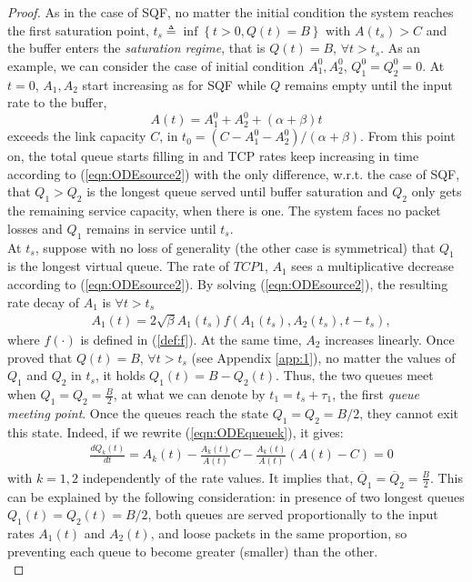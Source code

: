 \documentclass[a4paper,oneside, 11pt]{article}
\begin{document}
\begin{proof}
As in the case of SQF, no matter the initial condition the system reaches the first saturation point,
$ t_s \triangleq  \inf\left \{ t>0, Q(t)=B \right \}$
with $A(t_s)>C$ and the buffer enters the \textit{saturation regime}, that is $Q(t)=B$, $\forall t>t_s$.
As an example, we can consider the case of initial condition $A_1^0,A_2^0$, $Q_1^0=Q_2^0=0$.
At $t=0$, $A_1,A_2$ start increasing as for SQF while $Q$ remains empty
until the input rate to the buffer, $$A(t)=A_1^0+A_2^0+(\alpha+\beta)t$$
exceeds the link capacity $C$, in $t_0=(C-A_1^0-A_2^0)/(\alpha+\beta)$.
From this point on, the total queue starts filling in and TCP rates keep increasing in time according to (\ref{eqn:ODEsource2}) with the only difference, w.r.t. the case of SQF, that
$Q_1>Q_2$ is the longest queue served until buffer saturation and $Q_2$ only gets the remaining service capacity, when there is one.
The system faces no packet losses and $Q_1$ remains in service until  $t_s$.\\
At $t_s$,
suppose with no loss of generality (the other case is symmetrical) that $Q_1$ is the longest virtual queue. The rate of $TCP1$, $A_1$ sees a multiplicative decrease according to (\ref{eqn:ODEsource2}).
By solving (\ref{eqn:ODEsource2}), the resulting rate decay of $A_1$ is $\forall t>t_s$
\begin{align}\label{A1*_after_LQF}
&A_1(t)=2\sqrt{\beta}A_1(t_s)f(A_1(t_s),A_2(t_s),t-t_s),
\end{align}
where $f(\cdot)$ is defined in (\ref{def:f}).
At the same time, $A_2$ increases linearly.
Once proved that $Q(t)=B$, $\forall t>t_s$ (see Appendix \ref{app:1}), no matter the values of $Q_1$ and $Q_2$ in $t_s$, it holds
$Q_1(t)=B- Q_2(t).$
Thus, the two queues meet when $Q_1=Q_2=\frac{B}{2}$, at
what we can denote by $t_1=t_s+\tau_1$, the first \textit{queue meeting point}.
Once the queues reach the state $Q_1=Q_2=B/2$, they cannot exit this state. Indeed, if we rewrite (\ref{eqn:ODEqueuek}), it gives:
\begin{align}\label{eq:fixedpoint_Q_LQF}
&\frac{dQ_k(t)}{dt}=A_k(t)-\frac{A_k(t)}{A(t)}C-\frac{A_k(t)}{A(t)}(A(t)-C)=0
\end{align}
with $k=1,2$ independently of the rate values.
It implies that,
$\label{mean_queues_LQF}\overline{Q}_1=\overline{Q}_2=\frac{B}{2}.$
This can be explained by the following consideration: in presence of two longest queues $Q_1(t)=Q_2(t)=B/2$, both queues are served proportionally
to the input rates $A_1(t)$ and $A_2(t)$, and loose packets in the same proportion, so preventing each queue to become greater (smaller) than the other.\\

\end{proof}
\end{document}
